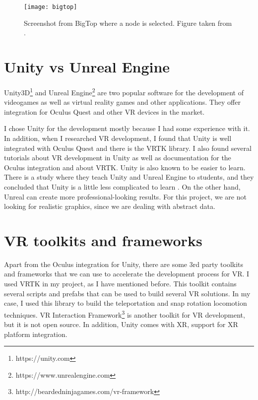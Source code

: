 \begin{figure}[h!]
    \centering%
    \texttt{[image: bigtop]}
    \caption{Screenshot from BigTop where a node is selected. Figure taken from \cite{bigtop}.}
    \label{fig:bigtop}
\end{figure}%

\section{Unity vs Unreal Engine}
Unity3D\footnote{https://unity.com} and Unreal Engine\footnote{https://www.unrealengine.com} are two popular software for the development of videogames as well as virtual reality games and other applications. They offer integration for Oculus Quest and other VR devices in the market.

I chose Unity for the development mostly because I had some experience with it. In addition, when I researched VR development, I found that Unity is well integrated with Oculus Quest and there is the VRTK library. I also found several tutorials about VR development in Unity as well as documentation for the Oculus integration and about VRTK. Unity is also known to be easier to learn. There is a study where they teach Unity and Unreal Engine to students, and they concluded that Unity is a little less complicated to learn \cite{unity_vs_unreal}. On the other hand, Unreal can create more professional-looking results. For this project, we are not looking for realistic graphics, since we are dealing with abstract data.

\section{VR toolkits and frameworks}
Apart from the Oculus integration for Unity, there are some 3rd party toolkits and frameworks that we can use to accelerate the development process for VR. I used VRTK in my project, as I have mentioned before. This toolkit contains several scripts and prefabs that can be used to build several VR solutions. In my case, I used this library to build the teleportation and snap rotation locomotion techniques. VR Interaction Framework\footnote{http://beardedninjagames.com/vr-framework} is another toolkit for VR development, but it is not open source. In addition, Unity comes with XR, support for XR platform integration.

